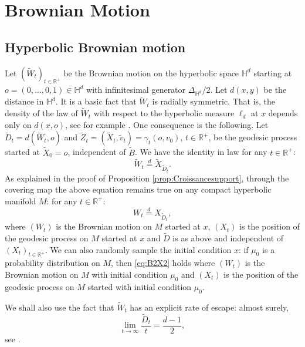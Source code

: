 \documentclass[]{scrartcl}
\newcommand{\dH}{\mathds H}
\newcommand{\R}{\mathds{R}}
\newcommand{\Rp}{\R^{+}}
\numberwithin{equation}{section}
\numberwithin{figure}{section}
\begin{document}
\section{Brownian Motion} \label{BM}

\subsection{Hyperbolic Brownian motion}

Let $(\widetilde W_t)_{t \in \Rp}$ be the Brownian motion on the hyperbolic space $\dH^d$ starting at $o = (0,\dots,0,1) \in \dH^d$ with infinitesimal generator $\Delta_{\dH^d} / 2$. 
Let $d (x,y)$ be the distance in $\dH^d$. It is a basic fact that $\widetilde W_t$ is radially symmetric. That is, the density of the law of $\widetilde W_t$ with respect to the hyperbolic measure $\ell_d$ at $x$ depends only on $d(x,o)$, see for example \cite[Subsection 3.3]{MR1882015}. One consequence is the following. Let $\widetilde D_t = d ( \widetilde W_t , o)$  and $\widetilde Z_t = (\widetilde X_t, \widetilde v_t) = \gamma_t (o , v_0) $, $t \in \Rp$, be the geodesic process started at $\widetilde X_0 = o$, independent of $\widetilde B$. We have the identity in law for any $t\in \Rp$:
\begin{equation*}\label{eq:B2X}
	\widetilde W_t \stackrel{d}{=} \widetilde X_{\widetilde D_t}.
\end{equation*} 
As explained in the proof of Proposition \ref{prop:Croissancesupport}, through the covering map the above equation remains true on any compact hyperbolic manifold $M$: for any $t\in \Rp$:
\begin{equation}\label{eq:B2X2}
	W_t \stackrel{d}{=}  X_{\widetilde D_t},
\end{equation}
where $(W_t)$ is the Brownian motion on $M$ started at $x$, $(X_t)$ is the position of the geodesic process on $M$ started at $x$ and $\widetilde D$ is as above and independent of $(X_t)_{t \in \Rp}$. We can also randomly sample the initial condition $x$: if $\mu_0$ is a probability distribution on $M$, then \eqref{eq:B2X2} holds where $(W_t)$ is the Brownian motion on $M$ with initial condition $\mu_0$ and $(X_t)$ is the position of the geodesic process on $M$ started with initial condition $\mu_0$.

We shall also use the fact that $\widetilde W_t$ has an explicit rate of escape: almost surely, 
\begin{equation}\label{eq:rate}
	\lim_{t \to \infty }  \frac{\widetilde D_t}{t} =  \frac{d -1}{2}, 
\end{equation}
see \cite{MR3176419,MR3631821}. 
\end{document}
